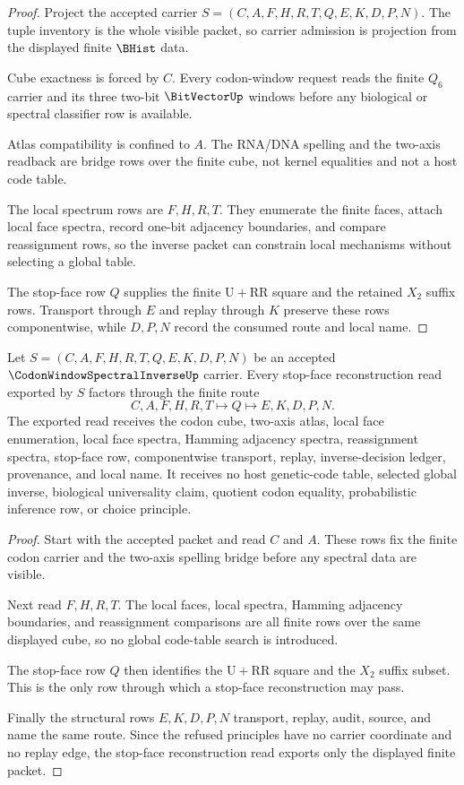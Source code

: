 \begin{proof}
Project the accepted carrier $S=(C,A,F,H,R,T,Q,E,K,D,P,N)$. The tuple inventory is the whole visible packet, so carrier admission is projection from the displayed finite $\BHist$ data.

Cube exactness is forced by $C$. Every codon-window request reads the finite $Q_{6}$ carrier and its three two-bit $\BitVectorUp$ windows before any biological or spectral classifier row is available.

Atlas compatibility is confined to $A$. The RNA/DNA spelling and the two-axis readback are bridge rows over the finite cube, not kernel equalities and not a host code table.

The local spectrum rows are $F,H,R,T$. They enumerate the finite faces, attach local face spectra, record one-bit adjacency boundaries, and compare reassignment rows, so the inverse packet can constrain local mechanisms without selecting a global table.

The stop-face row $Q$ supplies the finite $\mathrm{U}+\mathrm{RR}$ square and the retained $X_{2}$ suffix rows. Transport through $E$ and replay through $K$ preserve these rows componentwise, while $D,P,N$ record the consumed route and local name.
\end{proof}

\begin{theorem}
\label{thm:codon-window-spectral-inverse-stop-face-reconstruction}
Let $S=(C,A,F,H,R,T,Q,E,K,D,P,N)$ be an accepted $\CodonWindowSpectralInverseUp$ carrier. Every stop-face reconstruction read exported by $S$ factors through the finite route
$$
C,A,F,H,R,T \longmapsto Q \longmapsto E,K,D,P,N .
$$
The exported read receives the codon cube, two-axis atlas, local face enumeration, local face spectra, Hamming adjacency spectra, reassignment spectra, stop-face row, componentwise transport, replay, inverse-decision ledger, provenance, and local name. It receives no host genetic-code table, selected global inverse, biological universality claim, quotient codon equality, probabilistic inference row, or choice principle.
\end{theorem}
\begin{proof}
Start with the accepted packet and read $C$ and $A$. These rows fix the finite codon carrier and the two-axis spelling bridge before any spectral data are visible.

Next read $F,H,R,T$. The local faces, local spectra, Hamming adjacency boundaries, and reassignment comparisons are all finite rows over the same displayed cube, so no global code-table search is introduced.

The stop-face row $Q$ then identifies the $\mathrm{U}+\mathrm{RR}$ square and the $X_{2}$ suffix subset. This is the only row through which a stop-face reconstruction may pass.

Finally the structural rows $E,K,D,P,N$ transport, replay, audit, source, and name the same route. Since the refused principles have no carrier coordinate and no replay edge, the stop-face reconstruction read exports only the displayed finite packet.
\end{proof}

